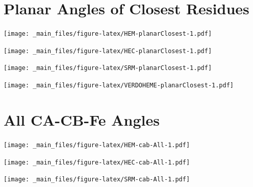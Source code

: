\documentclass[a4paper, nobind]{templates/ociamthesis}
\let\origfigure\figure
\let\endorigfigure\endfigure
\renewenvironment{figure}[1][2] {
    \expandafter\origfigure\expandafter[H]
} {
    \endorigfigure
}
\begin{document}
\hypertarget{figs-planarClosest}{%
\section{Planar Angles of Closest Residues}\label{figs-planarClosest}}

\begin{figure}
\centering
\texttt{[image: \_main\_files/figure-latex/HEM-planarClosest-1.pdf]}
\caption{\label{fig:HEM-planarClosest}HEM: Planar Angles of Closest Residues}
\end{figure}

\begin{figure}
\centering
\texttt{[image: \_main\_files/figure-latex/HEC-planarClosest-1.pdf]}
\caption{\label{fig:HEC-planarClosest}HEC: Planar Angles of Closest Residues}
\end{figure}

\begin{figure}
\centering
\texttt{[image: \_main\_files/figure-latex/SRM-planarClosest-1.pdf]}
\caption{\label{fig:SRM-planarClosest}SRM: Planar Angles of Closest Residues}
\end{figure}

\begin{figure}
\centering
\texttt{[image: \_main\_files/figure-latex/VERDOHEME-planarClosest-1.pdf]}
\caption{\label{fig:VERDOHEME-planarClosest}VERDOHEME: Planar Angles of Closest Residues}
\end{figure}

\hypertarget{figs-cabAll}{%
\section{All CA-CB-Fe Angles}\label{figs-cabAll}}

\begin{figure}
\centering
\texttt{[image: \_main\_files/figure-latex/HEM-cab-All-1.pdf]}
\caption{\label{fig:HEM-cab-All}HEM: All CA-CB-Fe Angles}
\end{figure}

\begin{figure}
\centering
\texttt{[image: \_main\_files/figure-latex/HEC-cab-All-1.pdf]}
\caption{\label{fig:HEC-cab-All}HEC: All CA-CB-Fe Angles}
\end{figure}

\begin{figure}
\centering
\texttt{[image: \_main\_files/figure-latex/SRM-cab-All-1.pdf]}
\caption{\label{fig:SRM-cab-All}SRM: All CA-CB-Fe Angles}
\end{figure}
\end{document}
